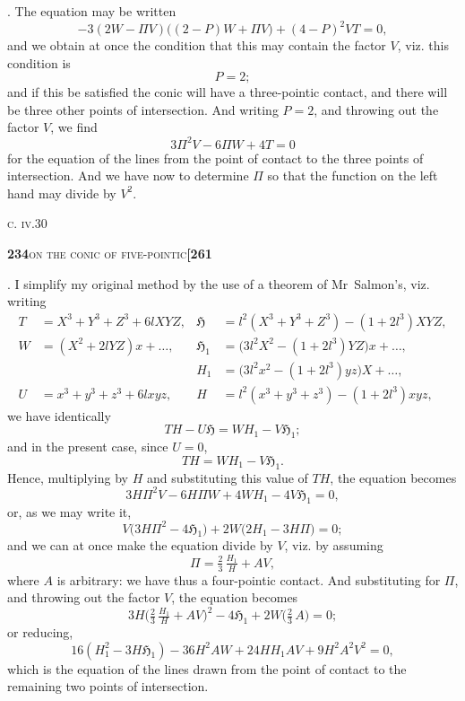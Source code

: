 \documentclass[11pt]{article}
\begin{document}
\medskip

. The equation may be written
\[
  -3(2W - \Pi V)\bigl((2 - P) W + \Pi V\bigr) + (4 - P)^2 V T = 0,
\]
and we obtain at once the condition that this may contain the factor $V$, viz. this condition is
\[
  P = 2;
\]
and if this be satisfied the conic will have a three-pointic contact, and there will be three other points of intersection. And writing $P = 2$, and throwing out the factor $V$, we find
\[
  3\Pi^2 V - 6\Pi W + 4T = 0
\]
for the equation of the lines from the point of contact to the three points of intersection. And we have now to determine $\Pi$ so that the function on the left hand may divide by $V^2$.

\medskip

\hfill {\footnotesize\textsc{c. iv.}\hfill 30}

\newpage
\noindent\textbf{234}\hfill\textsc{on the conic of five-pointic}\hfill\textbf{[261}

\medskip

. I simplify my original method by the use of a theorem of Mr~Salmon's, viz. writing
\[
\begin{aligned}
  T &= X^3 + Y^3 + Z^3 + 6lXYZ,        & \mathfrak{H} &= l^2(X^3 + Y^3 + Z^3) - (1 + 2l^3) XYZ,\\
  W &= (X^2 + 2lYZ) x + \ldots,         & \mathfrak{H}_1 &= \bigl(3l^2 X^2 - (1 + 2l^3) YZ\bigr) x + \ldots,\\
                                       & & H_1 &= \bigl(3l^2 x^2 - (1 + 2l^3) yz\bigr) X + \ldots,\\
  U &= x^3 + y^3 + z^3 + 6lxyz,         & H &= l^2(x^3 + y^3 + z^3) - (1 + 2l^3) xyz,
\end{aligned}
\]
we have identically
\[
  TH - U\mathfrak{H} = W H_1 - V \mathfrak{H}_1;
\]
and in the present case, since $U = 0$,
\[
  TH = W H_1 - V \mathfrak{H}_1.
\]
Hence, multiplying by $H$ and substituting this value of $TH$, the equation becomes
\[
  3H \Pi^2 V - 6H \Pi W + 4 W H_1 - 4 V \mathfrak{H}_1 = 0,
\]
or, as we may write it,
\[
  V\bigl(3H \Pi^2 - 4\mathfrak{H}_1\bigr) + 2W\bigl(2H_1 - 3H \Pi\bigr) = 0;
\]
and we can at once make the equation divide by $V$, viz. by assuming
\[
  \Pi = \tfrac{2}{3}\,\tfrac{H_1}{H} + AV,
\]
where $A$ is arbitrary: we have thus a four-pointic contact. And substituting for $\Pi$, and throwing out the factor $V$, the equation becomes
\[
  3H\bigl(\tfrac{2}{3}\,\tfrac{H_1}{H} + AV\bigr)^2 - 4\mathfrak{H}_1 + 2W\bigl(\tfrac{2}{3}\,A\bigr) = 0;
\]
or reducing,
\[
  16(H_1^2 - 3H \mathfrak{H}_1) - 36 H^2 A W + 24 H H_1 A V + 9 H^2 A^2 V^2 = 0,
\]
which is the equation of the lines drawn from the point of contact to the remaining two points of intersection.
\end{document}
